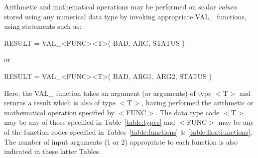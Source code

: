 \documentclass[11pt,nolof]{starlink}
\providecommand{\name}[1]{\mbox{#1}}
\begin{document}
Arithmetic and mathematical operations may be performed on scalar \emph{values} stored using any numerical data type by invoking appropriate
\name{VAL\_} functions, using statements such as:

\begin{terminalv}
RESULT = VAL_<FUNC><T>( BAD, ARG, STATUS )
\end{terminalv}
or
\begin{terminalv}
RESULT = VAL_<FUNC><T>( BAD, ARG1, ARG2, STATUS )
\end{terminalv}

Here, the \name{VAL\_} function takes an argument (or arguments) of type
\name{$<$T$>$} and returns a result which is also of type \name{$<$T$>$},
having performed the arithmetic or mathematical operation specified by
\name{$<$FUNC$>$}.
The data type code \name{$<$T$>$} may be any of those specified in
Table~\ref{table:types} and \name{$<$FUNC$>$} may be any of the function
codes specified in Tables~\ref{table:functions} \&
\ref{table:floatfunctions}.
The number of input arguments (1 or 2) appropriate to each function is also
indicated in these latter Tables.
\end{document}
